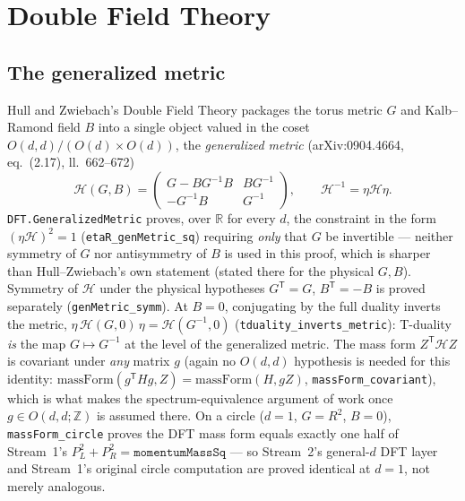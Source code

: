 \documentclass[11pt,a4paper]{article}
\theoremstyle{remark}
\begin{document}
\section{Double Field Theory}
\label{sec:dft}

\subsection{The generalized metric}
Hull and Zwiebach's Double Field Theory packages the torus metric $G$ and Kalb--Ramond field $B$
into a single object valued in the coset $O(d,d)/(O(d)\times O(d))$, the \emph{generalized metric}
(arXiv:0904.4664, eq.~(2.17), ll.~662--672)
\begin{equation}
  \mathcal{H}(G,B) = \begin{pmatrix} G - BG^{-1}B & BG^{-1} \\ -G^{-1}B & G^{-1}\end{pmatrix},
  \qquad \mathcal{H}^{-1}=\eta\mathcal{H}\eta.
\end{equation}
\texttt{DFT.GeneralizedMetric} proves, over $\mathbb{R}$ for every $d$, the constraint in the form
$(\eta\mathcal{H})^2=1$ (\texttt{etaR\_genMetric\_sq}) requiring \emph{only} that $G$ be invertible
--- neither symmetry of $G$ nor antisymmetry of $B$ is used in this proof, which is sharper than
Hull--Zwiebach's own statement (stated there for the physical $G,B$). Symmetry of $\mathcal{H}$
under the physical hypotheses $G^{\mathsf T}=G$, $B^{\mathsf T}=-B$ is proved separately
(\texttt{genMetric\_symm}). At $B=0$, conjugating by the full duality inverts the metric,
$\eta\,\mathcal{H}(G,0)\,\eta=\mathcal{H}(G^{-1},0)$ (\texttt{tduality\_inverts\_metric}): T-duality
\emph{is} the map $G\mapsto G^{-1}$ at the level of the generalized metric. The mass form
$Z^{\mathsf T}\mathcal{H}Z$ is covariant under \emph{any} matrix $g$ (again no $O(d,d)$ hypothesis
is needed for this identity: $\mathrm{massForm}(g^{\mathsf T}Hg,Z)=\mathrm{massForm}(H,gZ)$,
\texttt{massForm\_covariant}), which is what makes the spectrum-equivalence argument of
 work once $g\in O(d,d;\mathbb{Z})$ is assumed there. On a circle ($d=1$,
$G=R^2$, $B=0$), \texttt{massForm\_circle} proves the DFT mass form equals exactly one half of
Stream~1's $P_L^2+P_R^2=\mathtt{momentumMassSq}$ --- so Stream~2's general-$d$ DFT layer and
Stream~1's original circle computation are proved identical at $d=1$, not merely analogous.
\end{document}
